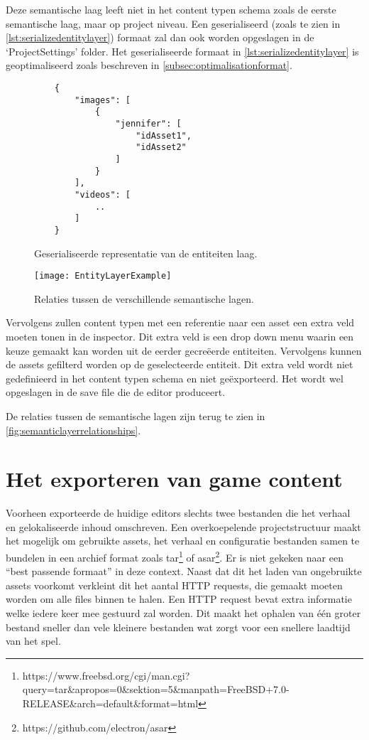 Deze semantische laag leeft niet in het content typen schema zoals de eerste semantische laag, maar op project niveau. Een geserialiseerd (zoals te zien in \autoref{lst:serializedentitylayer}) formaat zal dan ook worden opgeslagen in de ‘ProjectSettings’ folder. Het geserialiseerde formaat in \autoref{lst:serializedentitylayer} is geoptimaliseerd zoals beschreven in \autoref{subsec:optimalisationformat}.

\begin{figure}[htb]
    \centering
    \lstset{language=JavaScript}
    \begin{lstlisting}
    {
        "images": [
            {
                "jennifer": [
                    "idAsset1",
                    "idAsset2"
                ]
            }
        ],
        "videos": [
            ..
        ]
    }          
    \end{lstlisting}
    \caption{Geserialiseerde representatie van de entiteiten laag.}
    \label{lst:serializedentitylayer}
\end{figure}

\begin{wrapfigure}{r}{0.42\textwidth}
    \texttt{[image: EntityLayerExample]}
    \caption{Relaties tussen de verschillende semantische lagen.}
    \label{fig:semanticlayerrelationships}
    \centering
\end{wrapfigure}

Vervolgens zullen content typen met een referentie naar een asset een extra veld moeten tonen in de inspector. Dit extra veld is een drop down menu waarin een keuze gemaakt kan worden uit de eerder gecreëerde entiteiten. Vervolgens kunnen de assets gefilterd worden op de geselecteerde entiteit. Dit extra veld wordt niet gedefinieerd in het content typen schema en niet geëxporteerd. Het wordt wel opgeslagen in de save file die de editor produceert.

De relaties tussen de semantische lagen zijn terug te zien in \autoref{fig:semanticlayerrelationships}.

\clearpage
\section{Het exporteren van game content}
\label{sec:exportproces}
Voorheen exporteerde de huidige editors slechts twee bestanden die het verhaal en gelokaliseerde inhoud omschreven. Een overkoepelende projectstructuur maakt het mogelijk om gebruikte assets, het verhaal en configuratie bestanden samen te bundelen in een archief format zoals tar\footnote{https://www.freebsd.org/cgi/man.cgi?query=tar\&apropos=0\&sektion=5\&manpath=FreeBSD+7.0-RELEASE\&arch=default\&format=html} of asar\footnote{https://github.com/electron/asar}. Er is niet gekeken naar een “best passende formaat” in deze context. Naast dat dit het laden van ongebruikte assets voorkomt verkleint dit het aantal HTTP requests, die gemaakt moeten worden om alle files binnen te halen. Een HTTP request bevat extra informatie welke iedere keer mee gestuurd zal worden\cite{Fielding1999}. Dit maakt het ophalen van één groter bestand sneller dan vele kleinere bestanden wat zorgt voor een snellere laadtijd van het spel.

